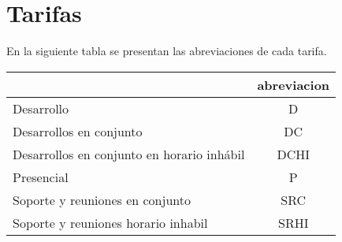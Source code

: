 \documentclass{article}
\begin{document}
\section{Tarifas}
    En la siguiente tabla se presentan las abreviaciones de cada tarifa.
\begin{table}[htbp]
    \centering
    \begin{tabular}{|p{6cm}|c|}
        \hline
        \centering{\textbf{Nombre}} & \textbf{abreviacion} \\ \hline  Desarrollo &  \label{D}D  \\ \hline 
 Desarrollos en conjunto &  \label{DC}DC  \\ \hline 
 Desarrollos en conjunto en horario inhábil &  \label{DCHI}DCHI  \\ \hline 
 Presencial &  \label{P}P  \\ \hline 
 Soporte y reuniones en conjunto &  \label{SRC}SRC  \\ \hline 
 Soporte y reuniones horario inhabil &  \label{SRHI}SRHI  \\ \hline 

    \end{tabular}
\end{table} 
 
\end{document}

